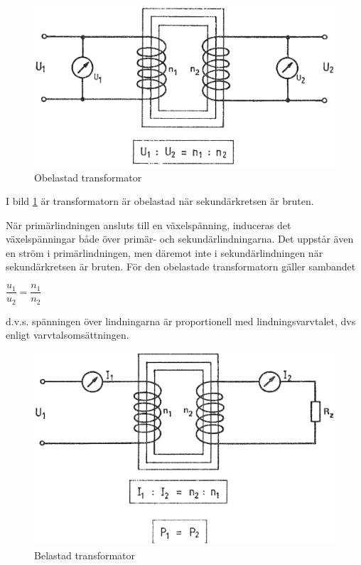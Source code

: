 \begin{figure}[h]
\begin{center}
\includegraphics[width=\textwidth]{images/cropped_pdfs/bild_2_2-06.pdf}
\caption{Obelastad transformator}
\label{fig:BildII2-6}
\end{center}
\end{figure}

I bild \ref{fig:BildII2-6} är transformatorn är obelastad när sekundärkretsen
är bruten.

När primärlindningen ansluts till en växelspänning, induceras det
växelspänningar både över primär- och sekundärlindningarna. Det uppstår även en
ström i primärlindningen, men däremot inte i sekundärlindningen när
sekundärkretsen är bruten. För den obelastade transformatorn gäller sambandet

\(\dfrac{u_1}{u_2} = \dfrac{n_1}{n_2}\)

d.v.s. spänningen över lindningarna är proportionell med lindningsvarvtalet,
dvs enligt varvtalsomsättningen.

\begin{figure}[h]
\begin{center}
\includegraphics[width=\textwidth]{images/cropped_pdfs/bild_2_2-07.pdf}
\caption{Belastad transformator}
\label{fig:BildII2-7}
\end{center}
\end{figure}

